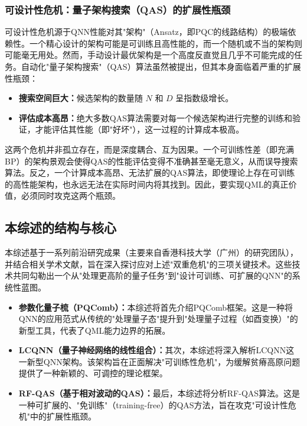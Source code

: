 \documentclass[12pt,a4paper]{article}
\begin{document}
\subsubsection{可设计性危机：量子架构搜索（QAS）的扩展性瓶颈}

可设计性危机源于QNN性能对其"架构"（Ansatz，即PQC的线路结构）的极端依赖性。一个精心设计的架构可能是可训练且高性能的，而一个随机或不当的架构则可能毫无用处。然而，手动设计最优架构是一个高度反直觉且几乎不可能完成的任务。自动化"量子架构搜索"（QAS）算法虽然被提出，但其本身面临着严重的扩展性瓶颈：

\begin{itemize}
\item \textbf{搜索空间巨大：}候选架构的数量随 $N$ 和 $D$ 呈指数级增长。
\item \textbf{评估成本高昂：}绝大多数QAS算法需要对每一个候选架构进行完整的训练和验证，才能评估其性能（即"好坏"），这一过程的计算成本极高。
\end{itemize}

这两个危机并非孤立存在，而是深度耦合、互为因果。一个可训练性差（即充满BP）的架构景观会使得QAS的性能评估变得不准确甚至毫无意义，从而误导搜索算法。反之，一个计算成本高昂、无法扩展的QAS算法，即使理论上存在可训练的高性能架构，也永远无法在实际时间内将其找到。因此，要实现QML的真正价值，必须同时攻克这两个瓶颈。

\subsection{本综述的结构与核心}

本综述基于一系列前沿研究成果（主要来自香港科技大学（广州）的研究团队），并结合相关学术文献，旨在深入探讨应对上述"双重危机"的三项关键技术。这些技术共同勾勒出一个从"处理更高阶的量子任务"到"设计可训练、可扩展的QNN"的系统性蓝图。

\begin{itemize}
\item \textbf{参数化量子梳（PQComb）：}本综述将首先介绍PQComb框架。这是一种将QNN的应用范式从传统的"处理量子态"提升到"处理量子过程（如酉变换）"的新型工具，代表了QML能力边界的拓展。
\item \textbf{LCQNN（量子神经网络的线性组合）：}其次，本综述将深入解析LCQNN这一新型QNN架构。该架构旨在正面解决"可训练性危机"，为缓解贫瘠高原问题提供了一种新颖的、可调控的理论框架。
\item \textbf{RF-QAS（基于相对波动的QAS）：}最后，本综述将分析RF-QAS算法。这是一种可扩展的、"免训练"（training-free）的QAS方法，旨在攻克"可设计性危机"中的扩展性瓶颈。
\end{itemize}
\end{document}
